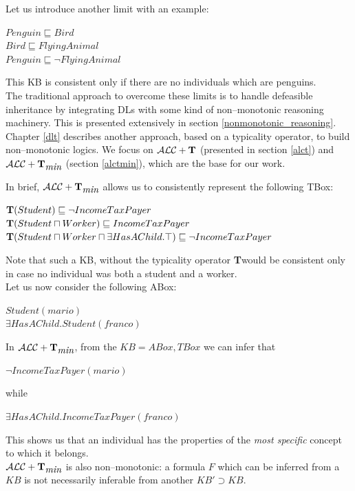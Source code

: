 \documentclass[a4paper, 11pt, oneside]{duthesis}
\newcommand{\tip}{{\bf T}}
\newcommand{\alct}{\mathcal{ALC}+\tip}
\newcommand{\alctmin}{\mathcal{ALC}+\tip_{\mbox{\em min}}}
\begin{document}
Let us introduce another limit with an example:
\begin{center}
$Penguin \sqsubseteq Bird$\\
$Bird \sqsubseteq FlyingAnimal$\\
$Penguin \sqsubseteq \neg FlyingAnimal$
\end{center}
This KB is consistent only if there are no individuals which are penguins.\\

The traditional approach to overcome these limits is to handle defeasible inheritance by integrating DLs with some kind of non--monotonic reasoning machinery. This is presented extensively in section \ref{nonmonotonic_reasoning}.\\

Chapter \ref{dlt} describes another approach, based on a typicality operator, to build non--monotonic logics. We focus on $\alct$ (presented in section \ref{alct}) and $\alctmin$ (section \ref{alctmin}), which are the base for our work.

In brief, $\alctmin$ allows us to consistently represent the following TBox:
\begin{center}
$\tip(Student) \sqsubseteq \neg IncomeTaxPayer$\\
$\tip(Student \sqcap Worker) \sqsubseteq IncomeTaxPayer$\\
$\tip(Student \sqcap Worker \sqcap \exists HasAChild.\top) \sqsubseteq \neg IncomeTaxPayer$
\end{center}
Note that such a KB, without the typicality operator \tip would be consistent only in case no individual was both a student and a worker.\\

Let us now consider the following ABox:
\begin{center}$Student(mario)$\\
$\exists HasAChild.Student(franco)$\end{center}

In $\alctmin$, from the $KB={ABox, TBox}$ we can infer that
\begin{center}$\neg IncomeTaxPayer(mario)$\end{center}
while
\begin{center}$\exists HasAChild.IncomeTaxPayer(franco)$\end{center}
This shows us that an individual has the properties of the \emph{most specific} concept to which it belongs.\\

$\alctmin$ is also non--monotonic: a formula $F$ which can be inferred from a $KB$ is not necessarily inferable from another $KB' \supset KB$.
\end{document}
